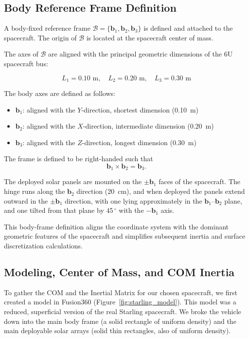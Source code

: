 \documentclass[12pt]{article}
\begin{document}
\subsection{Body Reference Frame Definition}

A body-fixed reference frame $\mathcal{B} = \{\mathbf{b}_1, \mathbf{b}_2, \mathbf{b}_3\}$ 
is defined and attached to the spacecraft.
The origin of $\mathcal{B}$ is located at the spacecraft center of mass.

The axes of $\mathcal{B}$ are aligned with the principal geometric dimensions of the 
6U spacecraft bus:

\[
L_1 = 0.10 \text{ m}, \quad
L_2 = 0.20 \text{ m}, \quad
L_3 = 0.30 \text{ m}
\]

The body axes are defined as follows:

\begin{itemize}
    \item $\mathbf{b}_1$: aligned with the $Y$-direction, shortest dimension (0.10~m)
    \item $\mathbf{b}_2$: aligned with the $X$-direction, intermediate dimension (0.20~m)
    \item $\mathbf{b}_3$: aligned with the $Z$-direction, longest dimension (0.30~m)
\end{itemize}

The frame is defined to be right-handed such that
\[
\mathbf{b}_1 \times \mathbf{b}_2 = \mathbf{b}_3.
\]

The deployed solar panels are mounted on the $\pm \mathbf{b}_1$ faces of the spacecraft.
The hinge runs along the $\mathbf{b}_2$ direction (20~cm), and when deployed the panels
extend outward in the $\pm \mathbf{b}_1$ direction, with one lying approximately in the
$\mathbf{b}_1$--$\mathbf{b}_2$ plane, and one tilted from that plane by 45$\,^\circ$ with the $-\mathbf{b}_1$ axis.

This body-frame definition aligns the coordinate system with the dominant geometric
features of the spacecraft and simplifies subsequent inertia and surface discretization
calculations.

\subsection{Modeling, Center of Mass, and COM Inertia}

\par
To gather the COM and the Inertial Matrix for our chosen spacecraft, we first created a model in Fusion360 (Figure~\ref{fig:starling_model}). This model was a reduced, superficial version of the real Starling spacecraft. We broke the vehicle down into the main body frame (a solid rectangle of uniform density) and the main deployable solar arrays (solid thin rectangles, also of uniform density).
\end{document}

